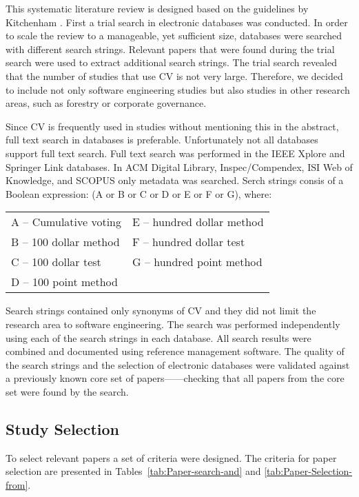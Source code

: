 This systematic literature review is designed based on the guidelines by Kitchenham \citep{Kitchenham2007}. First a trial search in electronic databases was conducted. In order to scale the review to a manageable, yet sufficient size, databases were searched with different search strings. Relevant papers that were found during the trial search were used to extract additional search strings. The trial search revealed that the number of studies that use CV is not very large. Therefore, we decided to include not only software engineering studies but also studies in other research areas, such as forestry or corporate governance.

Since CV is frequently used in studies without mentioning this in the abstract, full text search in databases is preferable. Unfortunately not all databases support full text search. Full text search was performed in the IEEE Xplore and Springer Link databases. In ACM Digital Library, Inspec\slash Compendex, ISI Web of Knowledge, and SCOPUS only metadata was searched.
Serch strings consis of a Boolean expression: (A or B or C or D or E or F or G), where:
\begin{table}[h!]
\begin{tabular}{
>{\raggedright}p{}
>{\raggedright}p{}
}
A -- Cumulative voting & E -- hundred dollar method \tabularnewline
B -- 100 dollar method & F -- hundred dollar test \tabularnewline
C -- 100 dollar test & G -- hundred point method \tabularnewline
D -- 100 point method & \tabularnewline
\end{tabular}
\end{table}

Search strings contained only synonyms of CV and they did not limit the research area to software engineering. The search was performed independently using each of the search strings in each database. 
All search results were combined and documented using reference management software. The quality of the search strings and the selection of electronic databases were validated against a previously known core set of papers---\citep{Ahl2005,Berander2006,Chatzipetrou2010,Regnell2001}---checking that all papers from the core set were found by the search.%

\subsection{Study Selection}

To select relevant papers a set of criteria were designed. The criteria for paper selection are presented in Tables~\ref{tab:Paper-search-and} and \ref{tab:Paper-Selection-from}.

